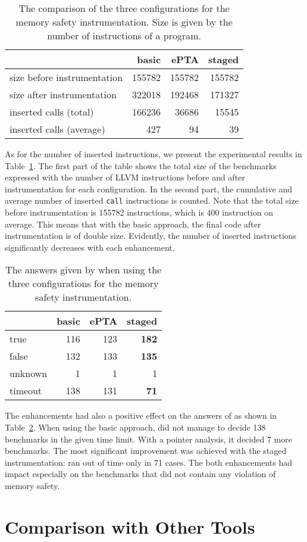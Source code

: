 \begin{table}[t]
\begin{tabular}{l  r   r   r}
 & basic & ePTA & staged \\
 \hline
 size before instrumentation & 155782 & 155782 & 155782 \\
 size after instrumentation  & 322018 & 192468 & 171327 \\
 \hline
 inserted calls (total)    & 166236 & 36686 & 15545 \\
 inserted calls (average)  & 427 & 94 & 39 \\
\end{tabular}
\caption{The comparison of the three configurations for the memory safety
instrumentation. Size is given by the number of instructions of a program.}
\label{tab:numbers}

\end{table}

As for the number of inserted instructions, we present the experimental results
in Table~\ref{tab:numbers}. The first part of the table shows the total size of
the benchmarks expressed with the number of LLVM instructions before and after
instrumentation for each configuration. In the second part, the cumulative and
average number of inserted \texttt{call} instructions is counted. Note that the
total size before instrumentation is 155782 instructions, which is 400
instruction on average. This means that with the basic approach, the final code
after instrumentation is of double size. Evidently, the number of inserted
instructions significantly decreases with each enhancement.


\begin{table}[h]
\begin{tabular}{l  r   r   r}
 & basic & ePTA & staged \\
 \hline
 true     & 116 & 123  & \textbf{182} \\
 false    & 132 & 133  & \textbf{135} \\
 unknown  & 1   & 1    & 1 \\
 timeout  & 138 & 131  & \textbf{71} \\
\end{tabular}
\caption{The answers given by \symbiotic when using the three configurations for the memory safety
instrumentation.}
\label{tab:answers}

\end{table}

The enhancements had also a positive effect on the answers of \symbiotic as
shown in Table~\ref{tab:answers}. When using the basic approach, \symbiotic did
not manage to decide 138 benchmarks in the given time limit. With a pointer
analysis, it decided 7 more benchmarks. The most significant improvement was
achieved with the staged instrumentation: \symbiotic ran out of time only in 71
cases. The both enhancements had impact especially on the benchmarks that did not
contain any violation of memory safety.

\section{Comparison with Other Tools}
